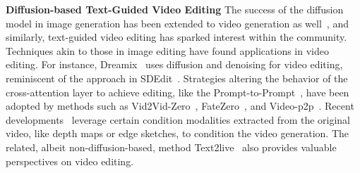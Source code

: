 \textbf{Diffusion-based Text-Guided Video Editing} 
The success of the diffusion model in image generation has been extended to video generation as well~\cite{ho2022video,harvey2022flexible,blattmann2023align,mei2023vidm,ho2022imagen}, and similarly, text-guided video editing has sparked interest within the community. Techniques akin to those in image editing have found applications in video editing. For instance, Dreamix~\cite{molad2023dreamix} uses diffusion and denoising for video editing, reminiscent of the approach in SDEdit~\cite{meng2021sdedit}. Strategies altering the behavior of the cross-attention layer to achieve editing, like the Prompt-to-Prompt~\cite{prompt2prompt}, have been adopted by methods such as Vid2Vid-Zero~\cite{vid2vid}, FateZero~\cite{qi2023fatezero}, and Video-p2p~\cite{liu2023video}. Recent developments~\cite{wang2023videocomposer,gen1,zhao2023controlvideo} leverage certain condition modalities extracted from the original video, like depth maps or edge sketches, to condition the video generation. The related, albeit non-diffusion-based, method Text2live~\cite{bar2022text2live} also provides valuable perspectives on video editing.




